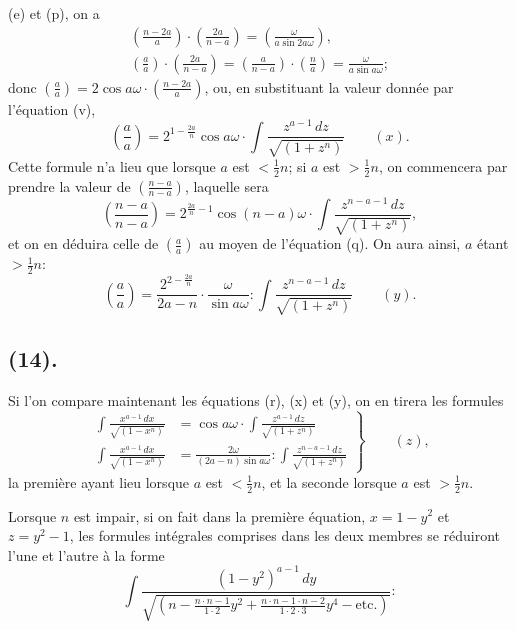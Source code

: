 \documentclass{article}
\begin{document}
(e) et (p), on a
\[ \begin{gathered} \left(\frac{n-2a}{a}\right)\cdot\left(\frac{2a}{n-a}\right)=\left(\frac{\omega}{a\sin 2a\omega}\right),\\ \left(\frac{a}{a}\right)\cdot\left(\frac{2a}{n-a}\right)=\left(\frac{a}{n-a}\right)\cdot\left(\frac{n}{a}\right)=\frac{\omega}{a\sin a\omega}; \end{gathered} \]
donc $\left(\frac{a}{a}\right)=2\cos a\omega\cdot\left(\frac{n-2a}{a}\right)$, ou, en substituant la valeur donnée par l'équation (v),
\[ \left(\frac{a}{a}\right)=2^{1-\frac{2a}{n}}\cos a\omega\cdot\int\frac{z^{a-1}\,dz}{\sqrt{(1+z^{n})}}\qquad(x). \]
Cette formule n'a lieu que lorsque $a$ est $<\frac{1}{2}n$; si $a$ est $>\frac{1}{2}n$, on commencera par prendre la valeur de $\left(\frac{n-a}{n-a}\right)$, laquelle sera
\[ \left(\frac{n-a}{n-a}\right)=2^{\frac{2a}{n}-1}\cos(n-a)\omega\cdot\int\frac{z^{n-a-1}\,dz}{\sqrt{(1+z^{n})}}, \]
et on en déduira celle de $\left(\frac{a}{a}\right)$ au moyen de l'équation (q). On aura ainsi, $a$ étant $>\frac{1}{2}n$:
\[ \left(\frac{a}{a}\right)=\frac{2^{2-\frac{2a}{n}}}{2a-n}\cdot\frac{\omega}{\sin a\omega}:\int\frac{z^{n-a-1}\,dz}{\sqrt{(1+z^{n})}}\qquad(y). \]

\subsection*{(14).}

Si l'on compare maintenant les équations (r), (x) et (y), on en tirera les formules
\[ \left.\begin{aligned} \int\frac{x^{a-1}\,dx}{\sqrt{(1-x^{n})}}&=\cos a\omega\cdot\int\frac{z^{a-1}\,dz}{\sqrt{(1+z^{n})}}\\ \int\frac{x^{a-1}\,dx}{\sqrt{(1-x^{n})}}&=\frac{2\omega}{(2a-n)\sin a\omega}:\int\frac{z^{n-a-1}\,dz}{\sqrt{(1+z^{n})}} \end{aligned}\right\}\qquad(z), \]
la première ayant lieu lorsque $a$ est $<\frac{1}{2}n$, et la seconde lorsque $a$ est $>\frac{1}{2}n$.

Lorsque $n$ est impair, si on fait dans la première équation, $x=1-y^{2}$ et $z=y^{2}-1$, les formules intégrales comprises dans les deux membres se réduiront l'une et l'autre à la forme
\[ \int\frac{(1-y^{2})^{a-1}\,dy}{\sqrt{\left(n-\frac{n\cdot n-1}{1\cdot 2}y^{2}+\frac{n\cdot n-1\cdot n-2}{1\cdot 2\cdot 3}y^{4}-\text{etc.}\right)}}: \]
\end{document}
